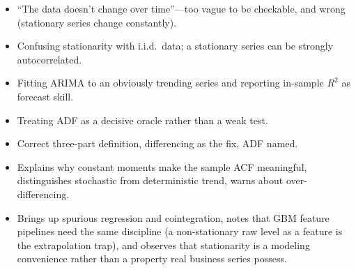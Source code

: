 \begin{interviewq}
\redflags
\begin{itemize}
    \item ``The data doesn't change over time''---too vague to be checkable, and wrong (stationary series change constantly).
    \item Confusing stationarity with i.i.d.\ data; a stationary series can be strongly autocorrelated.
    \item Fitting ARIMA to an obviously trending series and reporting in-sample $R^2$ as forecast skill.
    \item Treating ADF as a decisive oracle rather than a weak test.
\end{itemize}


\goodgreat
\begin{itemize}
    \item {} Correct three-part definition, differencing as the fix, ADF named.
    \item {} Explains why constant moments make the sample ACF meaningful, distinguishes stochastic from deterministic trend, warns about over-differencing.
    \item {} Brings up spurious regression and cointegration, notes that GBM feature pipelines need the same discipline (a non-stationary raw level as a feature is the extrapolation trap), and observes that stationarity is a modeling convenience rather than a property real business series possess.
\end{itemize}

\end{interviewq}

